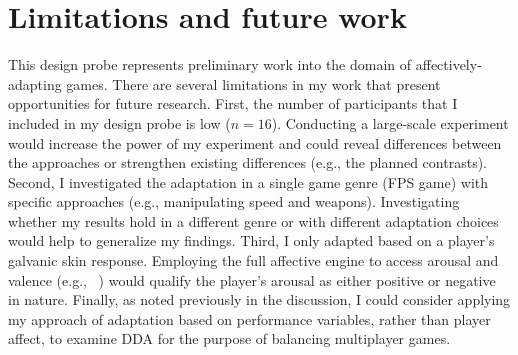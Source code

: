 \section{Limitations and future work}
This design probe represents preliminary work into the domain of affectively-adapting games. There are several limitations in my work that present opportunities for future research. First, the number of participants that I included in my design probe is low ($n=16$). Conducting a large-scale experiment would increase the power of my experiment and could reveal differences between the approaches or strengthen existing differences (e.g., the planned contrasts). Second, I investigated the adaptation in a single game genre (FPS game) with specific approaches (e.g., manipulating speed and weapons). Investigating whether my results hold in a different genre or with different adaptation choices would help to generalize my findings. Third, I only adapted based on a player's galvanic skin response. Employing the full affective engine to access arousal and valence (e.g., ~\cite{mandryk2007fuzzy}) would qualify the player's arousal as either positive or negative in nature. Finally, as noted previously in the discussion, I could consider applying my approach of adaptation based on performance variables, rather than player affect, to examine DDA for the purpose of balancing multiplayer games.
